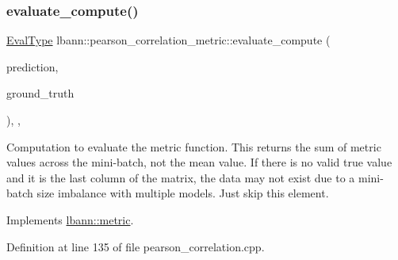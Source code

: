 \subsubsection{\texorpdfstring{evaluate\+\_\+compute()}{evaluate\_compute()}}
{\footnotesize\ttfamily \hyperlink{base_8hpp_a3266f5ac18504bbadea983c109566867}{Eval\+Type} lbann\+::pearson\+\_\+correlation\+\_\+metric\+::evaluate\+\_\+compute (\begin{DoxyParamCaption}\item[{const \hyperlink{base_8hpp_a9a697a504ae84010e7439ffec862b470}{Abs\+Dist\+Mat} \&}]{prediction,  }\item[{const \hyperlink{base_8hpp_a9a697a504ae84010e7439ffec862b470}{Abs\+Dist\+Mat} \&}]{ground\+\_\+truth }\end{DoxyParamCaption})\hspace{0.3cm}{\ttfamily [override]}, {\ttfamily [protected]}, {\ttfamily [virtual]}}

Computation to evaluate the metric function. This returns the sum of metric values across the mini-\/batch, not the mean value. If there is no valid true value and it is the last column of the matrix, the data may not exist due to a mini-\/batch size imbalance with multiple models. Just skip this element. 

Implements \hyperlink{classlbann_1_1metric_aab79147ff480675db2e01d7a889a4296}{lbann\+::metric}.



Definition at line 135 of file pearson\+\_\+correlation.\+cpp.


